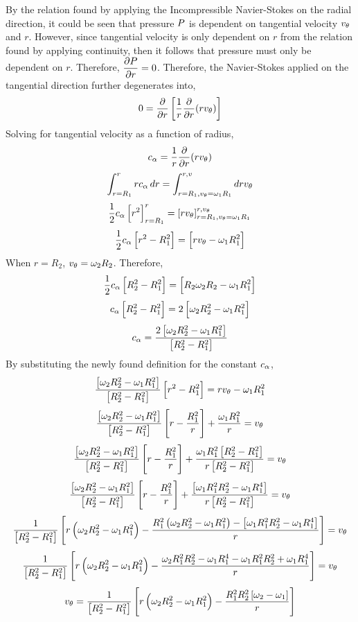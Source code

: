 \documentclass[a4paper, 12pt]{report}
\begin{document}
\begin{center}
By the relation found by applying the Incompressible Navier-Stokes on the radial direction, it could be seen that pressure $\displaystyle{P}$ is dependent on tangential velocity $v_\theta$ and $r$. However, since tangential velocity is only dependent on $r$ from the relation found by applying continuity, then it follows that pressure must only be dependent on $r$. Therefore, $\displaystyle{\frac{\partial P}{\partial r} = 0}$. Therefore, the Navier-Stokes applied on the tangential direction further degenerates into,
$$0 = \frac{\partial}{\partial r}\left[\frac{1}{r}\frac{\partial}{\partial r}(rv_\theta)\right]$$
Solving for tangential velocity as a function of radius,
$$c_\alpha = \frac{1}{r}\frac{\partial}{\partial r}(rv_\theta)$$
$$\int^{r}_{r=R_1}rc_\alpha\,dr = \int^{r,v}_{r=R_1,v_\theta = \omega_1R_1}drv_\theta$$
$$\frac{1}{2}c_\alpha\left[r^2\right]^{r}_{r=R_1} = \left[rv_\theta\right]^{r,v_\theta}_{r=R_1,v_\theta = \omega_1R_1}$$
$$\frac{1}{2}c_\alpha\left[r^2 - R_1^2\right] = \left[rv_\theta - \omega_1R_1^2\right]$$
When $r = R_2$, $v_\theta = \omega_2R_2$. Therefore,
$$\frac{1}{2}c_\alpha\left[R_2^2 - R_1^2\right] = \left[R_2\omega_2R_2 - \omega_1R_1^2\right]$$
$$c_\alpha\left[R_2^2 - R_1^2\right] = 2\left[\omega_2R_2^2 - \omega_1R_1^2\right]$$
$$c_\alpha = \frac{2\left[\omega_2R_2^2 - \omega_1R_1^2\right]}{\left[R_2^2 - R_1^2\right]}$$
By substituting the newly found definition for the constant $c_\alpha$,
$$\frac{\left[\omega_2R_2^2 - \omega_1R_1^2\right]}{\left[R_2^2 - R_1^2\right]}  \left[r^2 - R_1^2\right] = rv_\theta - \omega_1R_1^2$$
$$\frac{\left[\omega_2R_2^2 - \omega_1R_1^2\right]}{\left[R_2^2 - R_1^2\right]}  \left[r - \frac{R_1^2}{r}\right] + \frac{\omega_1R_1^2}{r} = v_\theta$$
$$\frac{\left[\omega_2R_2^2 - \omega_1R_1^2\right]}{\left[R_2^2 - R_1^2\right]}  \left[r - \frac{R_1^2}{r}\right] + \frac{\omega_1R_1^2\left[R_2^2 - R_1^2\right]}{r\left[R_2^2 - R_1^2\right]} = v_\theta$$
$$\frac{\left[\omega_2R_2^2 - \omega_1R_1^2\right]}{\left[R_2^2 - R_1^2\right]}  \left[r - \frac{R_1^2}{r}\right] + \frac{\left[\omega_1R_1^2R_2^2 - \omega_1R_1^4\right]}{r\left[R_2^2 - R_1^2\right]} = v_\theta$$
$$\frac{1}{\left[R_2^2 - R_1^2\right]}  \left[r\left(\omega_2R_2^2 - \omega_1R_1^2\right) - \frac{R_1^2\left(\omega_2R_2^2 - \omega_1R_1^2\right) - \left[\omega_1R_1^2R_2^2 - \omega_1R_1^4\right]}{r}\right] = v_\theta$$
$$\frac{1}{\left[R_2^2 - R_1^2\right]}  \left[r\left(\omega_2R_2^2 - \omega_1R_1^2\right) - \frac{\omega_2R_1^2R_2^2 - \omega_1R_1^4 - \omega_1R_1^2R_2^2 + \omega_1R_1^4}{r}\right] = v_\theta$$
$$v_\theta = \frac{1}{\left[R_2^2 - R_1^2\right]}  \left[r\left(\omega_2R_2^2 - \omega_1R_1^2\right) - \frac{R_1^2R_2^2\left[\omega_2 - \omega_1\right]}{r}\right]$$

\end{center}
\end{document}
